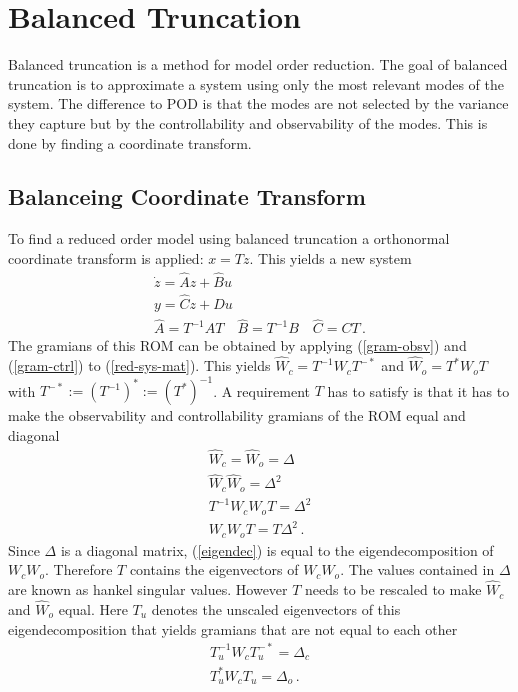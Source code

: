 \section{Balanced Truncation} \label{bt}
Balanced truncation is a method for model order reduction.
The goal of balanced truncation is to approximate a system using only the most relevant modes of the system.
The difference to POD is that the modes are not selected by the variance they capture but by the controllability and observability of the modes.
This is done by finding a coordinate transform.
\subsection{Balanceing Coordinate Transform} \label{balre}
To find a reduced order model using balanced truncation a orthonormal coordinate transform is applied: \(x = Tz\).
This yields a new system
\begin{gather}
\dot{z} = \hat{A}z + \hat{B}u \label{z1}\\
y = \hat{C}z + Du \label{z2} \\
\hat{A} = T^{-1}AT \quad \hat{B} = T^{-1}B \quad \hat{C} = CT \,.\label{red-sys-mat}
\end{gather}
The gramians of this ROM can be obtained by applying  (\ref{gram-obsv}) and (\ref{gram-ctrl}) to (\ref{red-sys-mat}).
This yields \(\hat{W}_c = T^{-1}W_cT^{-*}\) and \(\hat{W}_o = T^{*}W_oT\) with  \(T^{-*} := (T^{-1})^{*} := (T^{*})^{-1}\).
A requirement \(T\) has to satisfy is that it has to make the observability and controllability gramians of the ROM equal and diagonal
\begin{gather}
\hat{W}_c = \hat{W}_o = \Delta \\
\hat{W}_c \hat{W}_o = \Delta^{2} \\
T^{-1}W_cW_oT = \Delta^{2} \\
W_cW_oT = T\Delta^{2}  \,. \label{eigendec}
\end{gather}
Since \(\Delta\) is a diagonal matrix, (\ref{eigendec}) is equal to the eigendecomposition of \(W_cW_o\).
Therefore \(T\) contains the eigenvectors of \(W_cW_o\).
The values contained in \(\Delta\) are known as hankel singular values.
However \(T\) needs to be rescaled to make \(\hat{W}_c\) and \(\hat{W}_o\) equal.
Here \(T_u\) denotes the unscaled eigenvectors of this eigendecomposition that yields gramians that are not equal to each other
\begin{gather}
T_u^{-1}W_cT_u^{-*} = \Delta_c \label{e1}\\
T_u^{*}W_cT_u = \Delta_o  \,. \label{e2}
\end{gather}
